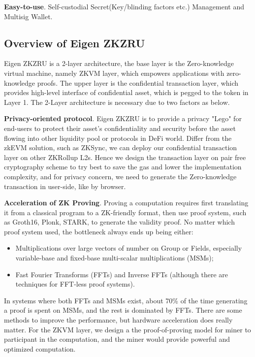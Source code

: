 \documentclass{article}
\begin{document}
\noindent\textbf{Easy-to-use}. Self-custodial Secret(Key/blinding factors etc.) Management and Multisig Wallet.


\subsection{Overview of Eigen ZKZRU}

Eigen ZKZRU is a 2-layer architecture, the base layer is the Zero-knowledge virtual machine, namely ZKVM layer, which empowers applications with zero-knowledge proofs. The upper layer is the confidential transaction layer, which provides high-level interface of confidential asset, which is pegged to the token in Layer 1. The 2-Layer architecture is necessary due to two factors as below.

\noindent\textbf{Privacy-oriented protocol}. Eigen ZKZRU is to provide a privacy "Lego" for end-users to protect their asset's confidentiality and security before the asset flowing into other liquidity pool or protocols in DeFi world. Differ from the zkEVM solution, such as ZKSync, we can deploy our confidential transaction layer on other ZKRollup L2s. Hence we design the transaction layer on pair free cryptography scheme to try best to save the gas and lower the implementation complexity, and for privacy concern, we need to generate the Zero-knowledge transaction in user-side, like by browser.

\noindent\textbf{Acceleration of ZK Proving}. Proving a computation requires first translating it from a classical program to a ZK-friendly format, then use proof system, such as Groth16, Plonk, STARK, to generate the validity proof. No matter which proof system used, the bottleneck always ends up being either:

\begin{itemize}
    \item Multiplications over large vectors of number on Group or Fields, especially variable-base and fixed-base multi-scalar multiplications (MSMs);
    \item Fast Fourier Transforms (FFTs) and Inverse FFTs (although there are techniques for FFT-less proof systems).
\end{itemize}

In systems where both FFTs and MSMs exist, about 70\% of the time generating a proof is spent on MSMs, and the rest is dominated by FFTs. There are some methods to improve the performance, but hardware acceleration does really matter.  For the ZKVM layer, we design a the proof-of-proving model for miner to participant in the computation, and the miner would provide powerful and optimized computation. 
\end{document}
